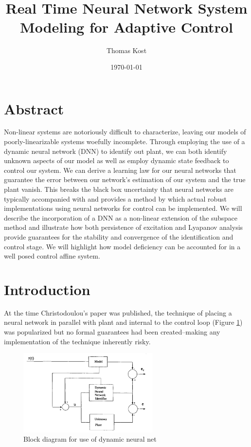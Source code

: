 \documentclass[12pt, letterpaper]{article}
\begin{document}
	\title{\vspace{-1in}Real Time Neural Network System Modeling for Adaptive Control	} 
	\author{Thomas Kost}
	\date{\today}
	\maketitle
	\tableofcontents
	
	\section{Abstract}
		Non-linear systems are notoriously difficult to characterize, leaving our models of poorly-linearizable systems woefully incomplete\cite{Narendra2}. Through employing the use of a dynamic neural network (DNN) to identify out plant, we can both identify unknown aspects of our model as well as employ dynamic state feedback to control our system. We can derive a learning law for our neural networks that guarantee the error between our network's estimation of our system and the true plant vanish\cite{Christ}. This breaks the black box uncertainty\cite{Narendra} that neural networks are typically accompanied with and provides a method by which actual robust implementations using neural networks for control can be implemented. We will describe the incorporation of a DNN as a non-linear extension of the subspace method and illustrate how both persistence of excitation and Lyapanov analysis provide guarantees for the stability and convergence of the identification and control stage. We will highlight how model deficiency can be accounted for in a well posed control affine system\cite{Koko}.	
		
	\section{Introduction}
		At the time Christodoulou's paper\cite{Christ} was published, the technique of placing a neural network in parallel with plant and internal to the control loop (Figure \ref{fig:block_diagram}) was popularized but no formal guarantees had been created--making any implementation of the technique inherently risky. 

		
		\begin{figure}
		\centering
		\includegraphics[width=7cm]{block_diagram.png}
		\caption{Block diagram for use of dynamic neural net}
		\label{fig:block_diagram}
		\end{figure}	
	
\end{document}
